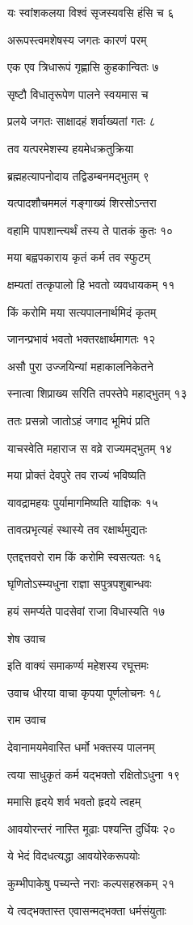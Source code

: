 यः स्वांशकलया विश्वं सृजस्यवसि हंसि च ६

अरूपस्त्वमशेषस्य जगतः कारणं परम्

एक एव त्रिधारूपं गृह्णासि कुहकान्वितः ७

सृष्टौ विधातृरूपेण पालने स्वयमास च

प्रलये जगतः साक्षादहं शर्वाख्यतां गतः ८

तव यत्परमेशस्य हयमेधक्रतुक्रिया

ब्रह्महत्यापनोदाय तद्विडम्बनमद्भुतम् ९

यत्पादशौचममलं गङ्गाख्यं शिरसोऽन्तरा

वहामि पापशान्त्यर्थं तस्य ते पातकं कुतः १०

मया बह्वपकाराय कृतं कर्म तव स्फुटम्

क्षम्यतां तत्कृपालो हि भवतो व्यवधायकम् ११

किं करोमि मया सत्यपालनार्थमिदं कृतम्

जानन्प्रभावं भवतो भक्तरक्षार्थमागतः १२

असौ पुरा उज्जयिन्यां महाकालनिकेतने

स्नात्वा शिप्राख्य सरिति तपस्तेपे महाद्भुतम् १३

ततः प्रसन्नो जातोऽहं जगाद भूमिपं प्रति

याचस्वेति महाराज स वव्रे राज्यमद्भुतम् १४

मया प्रोक्तं देवपुरे तव राज्यं भविष्यति

यावद्रामहयः पुर्यामागमिष्यति याज्ञिकः १५

तावत्प्रभृत्यहं स्थास्ये तव रक्षार्थमुद्यतः

एतद्दत्तवरो राम किं करोमि स्वसत्यतः १६

घृणितोऽस्म्यधुना राज्ञा सपुत्रपशुबान्धवः

हयं समर्प्यते पादसेवां राजा विधास्यति १७

शेष उवाच

इति वाक्यं समाकर्ण्य महेशस्य रघूत्तमः

उवाच धीरया वाचा कृपया पूर्णलोचनः १८

राम उवाच

देवानामयमेवास्ति धर्मो भक्तस्य पालनम्

त्वया साधुकृतं कर्म यद्भक्तो रक्षितोऽधुना १९

ममासि हृदये शर्व भवतो हृदये त्वहम्

आवयोरन्तरं नास्ति मूढाः पश्यन्ति दुर्धियः २०

ये भेदं विदधत्यद्धा आवयोरेकरूपयोः

कुम्भीपाकेषु पच्यन्ते नराः कल्पसहस्रकम् २१

ये त्वद्भक्तास्त एवासन्मद्भक्ता धर्मसंयुताः

